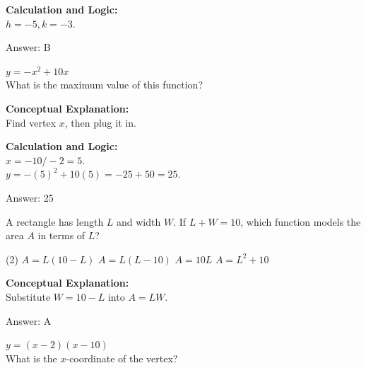 \documentclass[11pt,paper=a4,answers]{exam}
\begin{document}
\begin{questions}
\begin{solution}
\textbf{Calculation and Logic:} \\
$h = -5, k = -3$.

\vspace{25pt}

Answer: \colorbox{yellow!100}{B}
\end{solution}

\vspace{40pt}

\question
$y = -x^2 + 10x$ \\
What is the maximum value of this function?

\begin{solution}
\textbf{Conceptual Explanation:} \\
Find vertex $x$, then plug it in.

\vspace{20pt}

\textbf{Calculation and Logic:} \\
$x = -10 / -2 = 5$. \\
$y = -(5)^2 + 10(5) = -25 + 50 = 25$.

\vspace{25pt}

Answer: \colorbox{yellow!100}{25}
\end{solution}

\vspace{40pt}

\question
A rectangle has length $L$ and width $W$. If $L + W = 10$, which function models the area $A$ in terms of $L$?
\begin{tasks}(2)
    \task $A = L(10-L)$
    \task $A = L(L-10)$
    \task $A = 10L$
    \task $A = L^2 + 10$
\end{tasks}

\begin{solution}
\textbf{Conceptual Explanation:} \\
Substitute $W = 10 - L$ into $A = LW$.

\vspace{25pt}

Answer: \colorbox{yellow!100}{A}
\end{solution}

\vspace{40pt}

\question
$y = (x-2)(x-10)$ \\
What is the $x$-coordinate of the vertex?


\end{questions}
\end{document}
